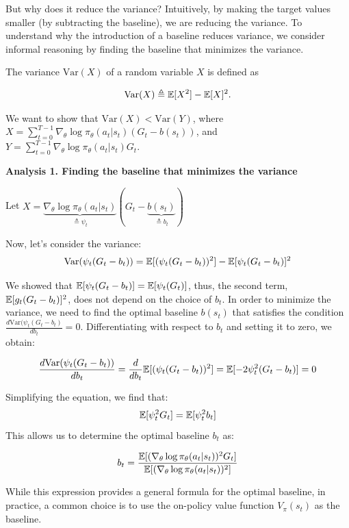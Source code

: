 \documentclass{article}
\begin{document}
But why does it reduce the variance? Intuitively, by making the target values smaller (by subtracting the baseline), we are reducing the variance. To understand why the introduction of a baseline reduces variance, we consider informal reasoning by finding the baseline that minimizes the variance.

The variance \(\text{Var}(X)\) of a random variable \(X\) is defined as

\begin{align*}
\text{Var}(X) \triangleq {\mathbb E}[X^2] - {\mathbb E}[X]^2.
\end{align*}

We want to show that $\text{Var}(X) < \text{Var}(Y)$, where $X = \sum_{t=0}^{T-1} \nabla_\theta \log \pi_\theta(a_t \vert s_t) (G_t - b(s_t))   $, and $Y = \sum_{t=0}^{T-1} \nabla_\theta \log \pi_\theta(a_t \vert s_t) G_t$.

\vspace{10pt}
\textbf{Analysis 1. Finding the baseline that minimizes the variance} 


Let $X = \underbrace{\nabla_\theta \log \pi_\theta(a_t \vert s_t)}_{\triangleq \psi_t} (G_t - \underbrace{b(s_t)}_{\triangleq b_t})$

Now, let's consider the variance:
\begin{align*}
    \text{Var}(\psi_t (G_t - b_t)) = {\mathbb E}[(\psi_t (G_t - b_t))^2] - {\mathbb E}[\psi_t (G_t - b_t)]^2
\end{align*}

We showed that ${\mathbb E}[\psi_t (G_t - b_t)] = {\mathbb E}[\psi_t (G_t)]$, thus, the second term, \({\mathbb E}[g_t (G_t - b_t)]^2\), does not depend on the choice of \(b_t\).
In order to minimize the variance, we need to find the optimal baseline \(b(s_t)\) that satisfies the condition \(\frac{d\text{Var}(\psi_t(G_t - b_t)}{db_t} = 0\). Differentiating with respect to \(b_t\) and setting it to zero, we obtain:

\[
\frac{d\text{Var}(\psi_t (G_t - b_t))}{db_t} = \frac{d}{db_t} {\mathbb E}[(\psi_t (G_t - b_t))^2] = {\mathbb E}[-2\psi_t^2 (G_t - b_t)] = 0
\]

Simplifying the equation, we find that:
\[
{\mathbb E}[\psi_t^2 G_t] = {\mathbb E}[\psi_t^2 b_t]
\]
This allows us to determine the optimal baseline \(b_t\) as:

\[
b_t = \frac{{\mathbb E}[(\nabla_\theta \log \pi_\theta(a_t \vert s_t))^2 G_t]}{{\mathbb E}[(\nabla_\theta \log \pi_\theta(a_t \vert s_t))^2]}
\]

While this expression provides a general formula for the optimal baseline, in practice, a common choice is to use the on-policy value function \(V_\pi(s_t)\) as the baseline.
\end{document}
